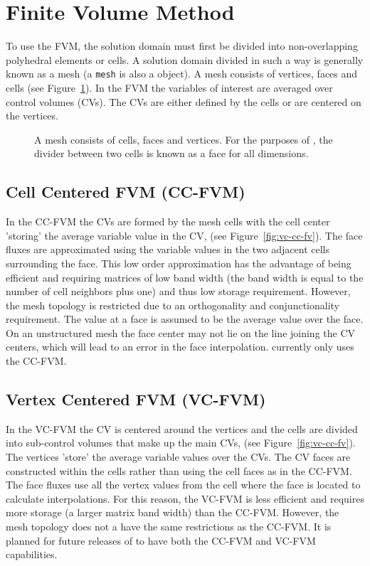 \section{Finite Volume Method}

To use the FVM, the solution domain must first be divided into
non-overlapping polyhedral elements or cells. A solution domain
divided in such a way is generally known as a mesh (a \texttt{mesh} is
also a \FiPy{} object). A mesh consists of vertices, faces and cells
(see Figure~\ref{fig:meshcartoon}).  In the FVM the variables of
interest are averaged over control volumes (CVs). The CVs are either
defined by the cells or are centered on the vertices.

\begin{figure}
 \begin{center}
 \caption{A mesh consists of cells, faces and vertices. For the
 purposes of \FiPy{}, the divider between two cells is known as a face
 for all dimensions.}  \label{fig:meshcartoon} \end{center}
\end{figure}

\subsection{Cell Centered FVM (CC-FVM)}

In the CC-FVM the CVs are formed by the mesh cells with the cell
center 'storing' the average variable value in the CV, (see
Figure~\ref{fig:vc-cc-fv}). The face fluxes are approximated using the
variable values in the two adjacent cells surrounding the face. This
low order approximation has the advantage of being efficient and
requiring matrices of low band width (the band width is equal to the
number of cell neighbors plus one) and thus low storage
requirement. However, the mesh topology is restricted due to an
orthogonality and conjunctionality requirement. The value at a face is
assumed to be the average value over the face. On an unstructured mesh
the face center may not lie on the line joining the CV centers, which
will lead to an error in the face interpolation. \FiPy{} currently
only uses the CC-FVM.

\subsection{Vertex Centered FVM (VC-FVM)}

In the VC-FVM the CV is centered around the vertices and the cells are
divided into sub-control volumes that make up the main CVs, (see
Figure~\ref{fig:vc-cc-fv}). The vertices 'store' the average variable
values over the CVs. The CV faces are constructed within the cells
rather than using the cell faces as in the CC-FVM. The face fluxes use
all the vertex values from the cell where the face is located to
calculate interpolations. For this reason, the VC-FVM is less
efficient and requires more storage (a larger matrix band width) than
the CC-FVM.  However, the mesh topology does not a have the same
restrictions as the CC-FVM. It is planned for future releases of
\FiPy{} to have both the CC-FVM and VC-FVM capabilities.

